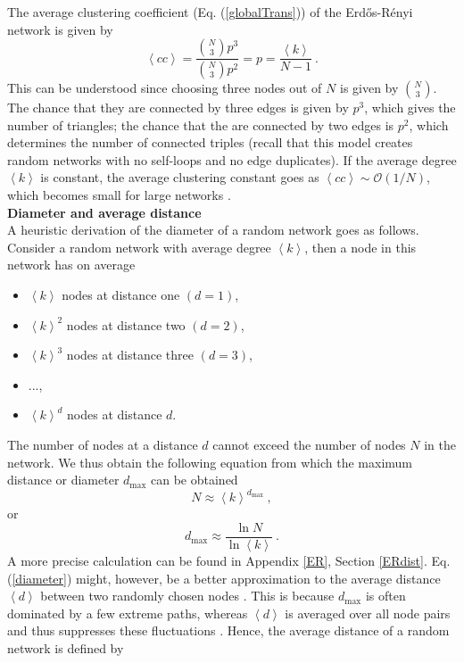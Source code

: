 \documentclass[11 pt , letterpaper , twoside , openright]{book}
\begin{document}
\newline
The average clustering coefficient (Eq. (\ref{globalTrans})) of the Erd\H{o}s-R\'{e}nyi network is given by \cite{Clauset2011}
\begin{equation}\label{C}
	\left<cc\right> = \frac{\binom{N}{3}p^3}{\binom{N}{3}p^2} = p = \frac{\left<k\right>}{N-1} \ .
\end{equation}
This can be understood since choosing three nodes out of $N$ is given by $\binom{N}{3}$. The chance that they are connected by three edges is given by $p^3$, which gives the number of triangles; the chance that the are connected by two edges is $p^2$, which determines the number of connected triples (recall that this model creates random networks with no self-loops and no edge duplicates). If the average degree $\left<k\right>$ is constant, the average clustering constant goes as $\left<cc\right> \sim \mathcal{O}(1/N)$, which becomes small for large networks \cite{Clauset2011}. \\
\newline
\textbf{Diameter and average distance}\\
\newline
A heuristic derivation of the diameter of a random network goes as follows. Consider a random network with average degree $\left<k\right>$, then a node in this network has on average \cite{Albert2014}
\begin{itemize}
	\item $\left<k\right>$ nodes at distance one $(d=1)$,
	\item $\left<k\right>^2$ nodes at distance two $(d=2)$,
	\item $\left<k\right>^3$ nodes at distance three $(d=3)$,
	\item ...,
	\item $\left<k\right>^d$ nodes at distance $d$.
\end{itemize}
The number of nodes at a distance $d$ cannot exceed the number of nodes $N$ in the network. We thus obtain the following equation from which the maximum distance or diameter $d_{\textrm{max}}$ can be obtained
\begin{equation}
	N \approx \left<k\right>^{d_{\textrm{max}}} \ ,
\end{equation}
or 
\begin{equation}\label{diameter}
	d_{\textrm{max}} \approx \frac{\ln{N}}{\ln{\left<k\right>}} \ .
\end{equation}
A more precise calculation can be found in Appendix \ref{ER}, Section \ref{ERdist}. Eq. (\ref{diameter}) might, however, be a better approximation to the average distance $\left<d\right>$ between two randomly chosen nodes \cite{Albert2014}. This is because $d_{\textrm{max}}$ is often dominated by a few extreme paths, whereas $\left<d\right>$ is averaged over all node pairs and thus suppresses these fluctuations \cite{Albert2014}. Hence, the average distance of a random network is defined by \cite{Albert2014}
\end{document}
